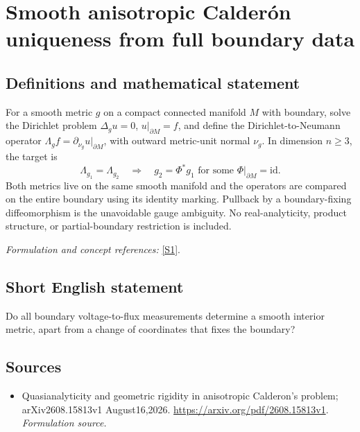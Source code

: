 \documentclass[11pt]{article}
\begin{document}
\section*{\texorpdfstring{Smooth anisotropic Calderón uniqueness from full boundary data}{Smooth anisotropic Calderón uniqueness from full boundary data}}\label{30006770}
\subsection{Definitions and mathematical statement}
For a smooth metric $g$ on a compact connected manifold $M$ with boundary, solve the Dirichlet problem $\Delta_g u=0$, $u|_{\partial M}=f$, and define the Dirichlet-to-Neumann operator
$\Lambda_g f=\partial_{\nu_g}u|_{\partial M}$, with outward metric-unit normal $\nu_g$. In dimension $n\ge3$, the target is
\[
 \Lambda_{g_1}=\Lambda_{g_2}\quad\Longrightarrow\quad
 g_2=\Phi^*g_1\text{ for some }\Phi|_{\partial M}=\mathrm{id}.
\]
Both metrics live on the same smooth manifold and the operators are compared on the entire boundary using its identity marking. Pullback by a boundary-fixing diffeomorphism is the unavoidable gauge ambiguity. No real-analyticity, product structure, or partial-boundary restriction is included.
\par\smallskip\textit{Formulation and concept references:} \href{https://arxiv.org/pdf/2608.15813v1}{[S1]}.

\subsection{Short English statement}
Do all boundary voltage-to-flux measurements determine a smooth interior metric, apart from a change of coordinates that fixes the boundary?
\subsection{Sources}
\begin{itemize}
\item[S1]Quasianalyticity and geometric rigidity in anisotropic Calderon's problem; arXiv2608.15813v1 August16,2026.
\url{https://arxiv.org/pdf/2608.15813v1}.
\textit{Formulation source.}
\end{itemize}
\end{document}
